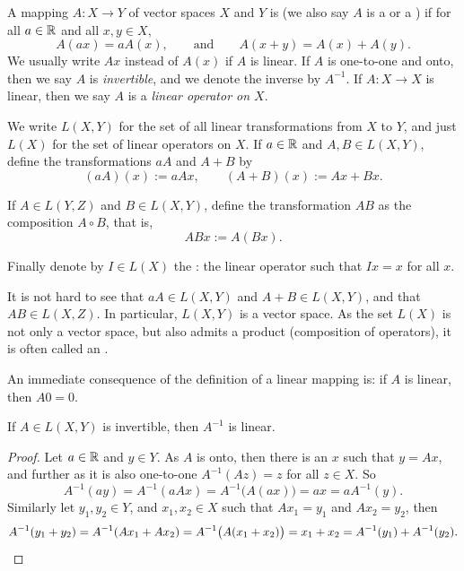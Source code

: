 \begin{defn}
A mapping $A \colon X \to Y$ of vector spaces $X$ and $Y$
is \emph{} (we also say $A$ is a
\emph{}
or a \emph{})
if for all $a \in {\mathbb{R}}$ and all $x,y \in X$,
\begin{equation*}
A(a x) = a A(x), \qquad \text{and} \qquad A(x+y) = A(x)+A(y) .
\end{equation*}
We usually write $Ax$ instead of $A(x)$ if $A$ is linear.
If $A$ is one-to-one and onto, then we say $A$ is
\emph{invertible},
and we denote the inverse by $A^{-1}$.
If $A \colon X \to X$ is linear, then we say $A$ is a
\emph{linear operator on $X$}.

We write $L(X,Y)$ for the set of all linear transformations from $X$ to
$Y$, and just $L(X)$ for the set of linear operators on $X$.
If $a \in {\mathbb{R}}$ and $A,B \in L(X,Y)$, define
the transformations $aA$ and $A+B$ by
\begin{equation*}
(aA)(x) := aAx ,
\qquad
(A+B)(x) := Ax + Bx .
\end{equation*}

If $A \in L(Y,Z)$ and $B \in L(X,Y)$, define the
transformation $AB$ as the composition $A \circ B$, that is,
\begin{equation*}
ABx := A(Bx) .
\end{equation*}

Finally denote by $I \in L(X)$ the \emph{}: 
the linear operator such that $Ix = x$ for all $x$.
\end{defn}

It is not hard to see that $aA \in L(X,Y)$
and $A+B \in L(X,Y)$, and that $AB \in L(X,Z)$.
In particular, $L(X,Y)$ is a vector space.
As the set $L(X)$ is not only a vector space, but also
admits a product (composition of operators),
it is often called an \emph{}.

An immediate consequence of the definition of a linear mapping is: if
$A$ is linear, then $A0 = 0$.

\begin{prop}
If $A \in L(X,Y)$ is invertible, then $A^{-1}$ is linear.
\end{prop}

\begin{proof}
Let $a \in {\mathbb{R}}$ and $y \in Y$.  As $A$ is onto, then there is an 
$x$ such that $y = Ax$, and further as it is also one-to-one
$A^{-1}(Az) = z$ for all $z \in X$.  So
\begin{equation*}
A^{-1}(ay)
=
A^{-1}(aAx)
=
A^{-1}\bigl(A(ax)\bigr)
= ax
= aA^{-1}(y).
\end{equation*}
Similarly let $y_1,y_2 \in Y$, and $x_1, x_2 \in X$ such that
$Ax_1 = y_1$ and 
$Ax_2 = y_2$, then
\begin{equation*}
A^{-1}(y_1+y_2)
=
A^{-1}(Ax_1+Ax_2)
=
A^{-1}\bigl(A(x_1+x_2)\bigr)
= x_1+x_2
= A^{-1}(y_1) + A^{-1}(y_2). \qedhere
\end{equation*}
\end{proof}

